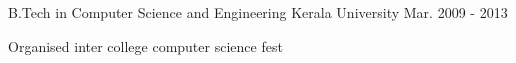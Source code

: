 

\begin{cventries}

  \cventry
    {B.Tech in Computer Science and Engineering } %
    {Kerala University} %
    {} %
    {Mar. 2009 - 2013} %
    {
      \begin{cvitems} %
        \item {Organised inter college computer science fest}
      \end{cvitems}
    }

\end{cventries}

